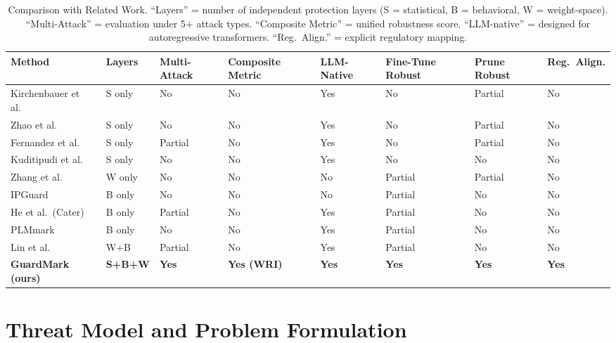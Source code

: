 \documentclass[journal,compsoc]{IEEEtran}
\begin{document}
\begin{table}[t]
\caption{Comparison with Related Work. ``Layers'' = number of independent
  protection layers (S = statistical, B = behavioral, W = weight-space).
  ``Multi-Attack'' = evaluation under 5+ attack types. ``Composite Metric'' =
  unified robustness score. ``LLM-native'' = designed for autoregressive
  transformers. ``Reg.\ Align.'' = explicit regulatory mapping.}
\label{tab:related}
\begin{tabularx}{\textwidth}{l X X X X X X X}
\toprule
\textbf{Method} & \textbf{Layers} & \textbf{Multi-Attack} & \textbf{Composite Metric} &
\textbf{LLM-Native} & \textbf{Fine-Tune Robust} & \textbf{Prune Robust} & \textbf{Reg.\ Align.} \\
\midrule
Kirchenbauer et al.~\cite{kirchenbauer2023watermark} & S only & No & No & Yes & No & Partial & No \\
Zhao et al.~\cite{zhao2023protecting}               & S only & No & No & Yes & No & Partial & No \\
Fernandez et al.~\cite{fernandez2023three}          & S only & Partial & No & Yes & No & Partial & No \\
Kuditipudi et al.~\cite{kuditipudi2023robust}       & S only & No & No & Yes & No & No & No \\
Zhang et al.~\cite{zhang2018protecting}             & W only & No & No & No & Partial & Partial & No \\
IPGuard~\cite{cao2021ipguard}                       & B only & No & No & No & Partial & No & No \\
He et al.\ (Cater)~\cite{he2022cater}              & B only & Partial & No & Yes & Partial & No & No \\
PLMmark~\cite{li2023plmmark}                        & B only & No & No & Yes & Partial & No & No \\
Lin et al.~\cite{lin2024towards}                    & W+B & Partial & No & Yes & Partial & No & No \\
\textbf{GuardMark (ours)}                           & \textbf{S+B+W} & \textbf{Yes} & \textbf{Yes (WRI)} &
  \textbf{Yes} & \textbf{Yes} & \textbf{Yes} & \textbf{Yes} \\
\bottomrule
\end{tabularx}
\end{table}

\section{Threat Model and Problem Formulation}
\label{sec:threat}
\end{document}

